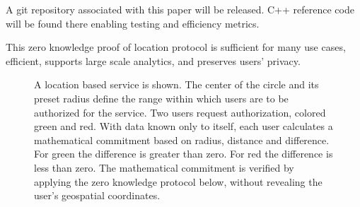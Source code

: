 \documentclass{article}
\begin{document}
A git repository associated with this paper will be released. C++ reference code will be found there enabling testing and efficiency metrics. 

This zero knowledge proof of location protocol is sufficient for many use cases, efficient, supports large scale analytics, and preserves users' privacy.

\begin{figure}
  \centering
  \def\svgwidth{\columnwidth}
  
\caption{A location based service is shown.
The center of the circle and its preset radius define the range within which users are to be authorized for the service.
Two users request authorization, colored green and red.
With data known only to itself, each user calculates a mathematical commitment based on radius, distance and difference.
For green the difference is greater than zero.
For red the difference is less than zero.
The mathematical commitment is verified by applying the zero knowledge protocol below, without revealing the user's geospatial coordinates.}
\label{fig-rangeproof}
\end{figure}
\end{document}
